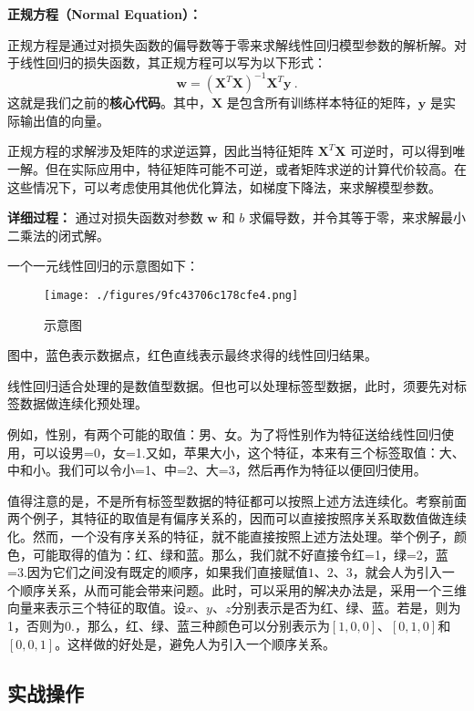 \textbf{正规方程（Normal Equation）：}

正规方程是通过对损失函数的偏导数等于零来求解线性回归模型参数的解析解。对于线性回归的损失函数，其正规方程可以写为以下形式：
\begin{equation}
\mathbf{w} = (\mathbf{X}^T \mathbf{X})^{-1} \mathbf{X}^T \mathbf{y}~.
\end{equation}
这就是我们之前的\textbf{核心代码}。其中，$\mathbf{X}$ 是包含所有训练样本特征的矩阵，$\mathbf{y}$ 是实际输出值的向量。

正规方程的求解涉及矩阵的求逆运算，因此当特征矩阵 $\mathbf{X}^T \mathbf{X}$ 可逆时，可以得到唯一解。但在实际应用中，特征矩阵可能不可逆，或者矩阵求逆的计算代价较高。在这些情况下，可以考虑使用其他优化算法，如梯度下降法，来求解模型参数。

\begin{example}{\textbf{详细过程：}
通过对损失函数对参数 $\mathbf{w}$ 和 $b$ 求偏导数，并令其等于零，来求解最小二乘法的闭式解。}

\end{example}

一个一元线性回归的示意图如下：
\begin{figure}[ht]
\centering
\texttt{[image: ./figures/9fc43706c178cfe4.png]}
\caption{示意图} \label{fig_LiGr_1}
\end{figure}
图中，蓝色表示数据点，红色直线表示最终求得的线性回归结果。

线性回归适合处理的是数值型数据。但也可以处理标签型数据，此时，须要先对标签数据做连续化预处理。

例如，性别，有两个可能的取值：男、女。为了将性别作为特征送给线性回归使用，可以设男=0，女=1.又如，苹果大小，这个特征，本来有三个标签取值：大、中和小。我们可以令小=1、中=2、大=3，然后再作为特征以便回归使用。

值得注意的是，不是所有标签型数据的特征都可以按照上述方法连续化。考察前面两个例子，其特征的取值是有偏序关系的，因而可以直接按照序关系取数值做连续化。然而，一个没有序关系的特征，就不能直接按照上述方法处理。举个例子，颜色，可能取得的值为：红、绿和蓝。那么，我们就不好直接令红=1，绿=2，蓝=3.因为它们之间没有既定的顺序，如果我们直接赋值$1$、$2$、$3$，就会人为引入一个顺序关系，从而可能会带来问题。此时，可以采用的解决办法是，采用一个三维向量来表示三个特征的取值。设$x$、$y$、$z$分别表示是否为红、绿、蓝。若是，则为1，否则为0.，那么，红、绿、蓝三种颜色可以分别表示为$[1,0,0]$、$[0,1,0]$和$[0,0,1]$。这样做的好处是，避免人为引入一个顺序关系。

\subsection{实战操作}

